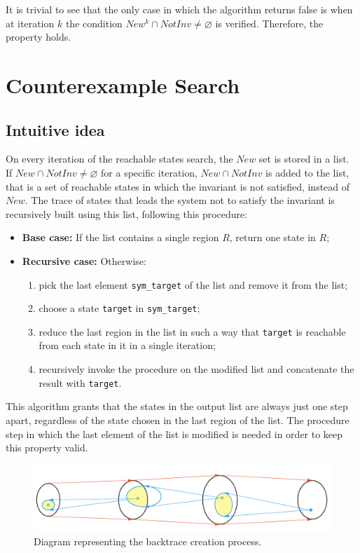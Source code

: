 \documentclass[12pt]{article}
\begin{document}
    It is trivial to see that the only case in which the algorithm returns false is when at iteration $k$ the condition $New^k \cap NotInv \neq \varnothing$ is verified.
    Therefore, the property holds.
    
    \section{Counterexample Search}
    \subsection{Intuitive idea}
    On every iteration of the reachable states search, the $New$ set is stored in a list.
    If $New \cap NotInv \neq \varnothing$ for a specific iteration, $New \cap NotInv$ is added to the list, that is a set of reachable states in which the invariant is not satisfied, instead of $New$.
    The trace of states that leads the system not to satisfy the invariant is recursively built using this list, following this procedure:
    \begin{itemize}
        \item \textbf{Base case:} If the list contains a single region $R$, return one state in $R$;
        \item \textbf{Recursive case:} Otherwise:
        \begin{enumerate}
            \item pick the last element \texttt{sym\_target} of the list and remove it from the list;
            \item choose a state \texttt{target} in \texttt{sym\_target};
            \item reduce the last region in the list in such a way that \texttt{target} is reachable from each state in it in a single iteration;
            \item recursively invoke the procedure on the modified list and concatenate the result with \texttt{target}.
        \end{enumerate}
    \end{itemize}
    This algorithm grants that the states in the output list are always just one step apart, regardless of the state chosen in the last region of the list.
    The procedure step in which the last element of the list is modified is needed in order to keep this property valid.
    
    \begin{figure}[H] 
        \centering
        \includegraphics[width=\textwidth]{backtrace-diagram.png}
        \caption{Diagram representing the backtrace creation process.}
        \label{fig:back_trace}
    \end{figure}
    
\end{document}
